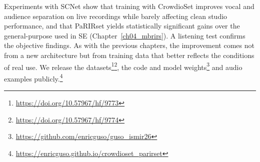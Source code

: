 Experiments with SCNet show that training with CrowdioSet improves vocal and
audience separation on live recordings while barely affecting clean studio
performance, and that PaRIRset yields statistically significant gains over the
general-purpose  used in \acrshort{SE}
(Chapter~\ref{ch04_mbrirs}). A listening test confirms the objective findings. As with the previous
chapters, the improvement comes not from a new architecture but from training
data that better reflects the conditions of real use. We release the datasets\footnote{\url{https://doi.org/10.57967/hf/9773}}\footnote{\url{https://doi.org/10.57967/hf/9774}}, the
code and model weights\footnote{\url{https://github.com/enricguso/guso_ismir26}} and
audio examples publicly.\footnote{\url{https://enricguso.github.io/crowdioset_parirset}}

